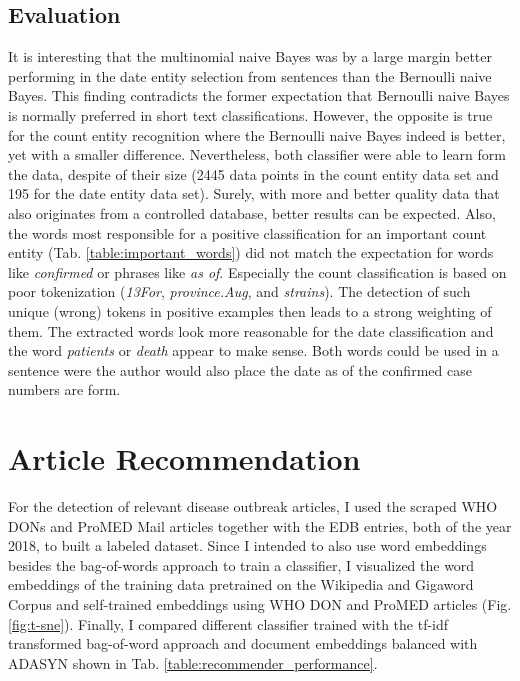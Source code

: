 \subsection{Evaluation}
  It is interesting that the multinomial naive Bayes was by a large margin better performing in the date entity selection from sentences than the Bernoulli naive Bayes.
  This finding contradicts the former expectation that Bernoulli naive Bayes is normally preferred in short text classifications.
  However, the opposite is true for the count entity recognition where the Bernoulli naive Bayes indeed is better, yet with a smaller difference.
  Nevertheless, both classifier were able to learn form the data, despite of their size (2445 data points in the count entity data set and 195 for the date entity data set). Surely, with more  and better quality data that also originates from a controlled database, better results can be expected. Also, the words most responsible for a positive classification for an important count entity (Tab. \ref{table:important_words}) did not match the expectation for words like \textit{confirmed} or phrases like \textit{as of}. Especially the count classification is based on poor tokenization (\textit{13For}, \textit{province.Aug}, and \textit{strains}). The detection of such unique (wrong) tokens in positive examples then leads to a strong weighting of them.  The extracted words look more reasonable for the date classification and the word \textit{patients} or \textit{death} appear to make sense. Both words could be used in a sentence were the author would also place the date as of the confirmed case numbers are form.

\section{Article Recommendation}
  For the detection of relevant disease outbreak articles, I used the scraped WHO DONs and ProMED Mail articles together with the EDB entries, both of the year 2018, to built a labeled dataset.
  Since I intended to also use word embeddings besides the bag-of-words approach to train a classifier, I visualized the word embeddings of the training data pretrained on the Wikipedia and Gigaword Corpus and self-trained embeddings using WHO DON and ProMED articles (Fig. \ref{fig:t-sne}).
  Finally, I compared different classifier trained with the tf-idf transformed bag-of-word approach and document embeddings balanced with ADASYN shown in Tab. \ref{table:recommender_performance}.

